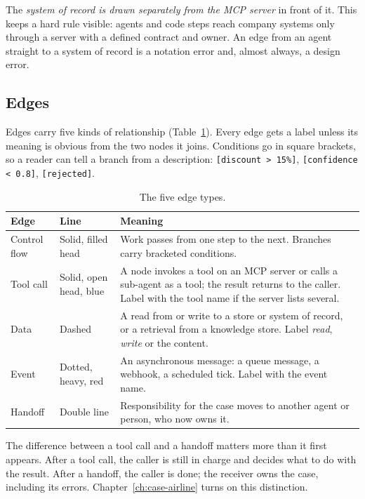 The \emph{system of record is drawn separately from the MCP server} in front of it. This keeps a hard rule visible: agents and code steps reach company systems only through a server with a defined contract and owner. An edge from an agent straight to a system of record is a notation error and, almost always, a design error.

\subsection{Edges}

Edges carry five kinds of relationship (Table~\ref{tab:edges}). Every edge gets a label unless its meaning is obvious from the two nodes it joins. Conditions go in square brackets, so a reader can tell a branch from a description: \texttt{[discount > 15\%]}, \texttt{[confidence < 0.8]}, \texttt{[rejected]}.

\begin{table}[htbp]
\centering
\small
\caption{The five edge types.}
\label{tab:edges}
\begin{tabularx}{\textwidth}{@{}>{\raggedright\arraybackslash}p{2.3cm}>{\raggedright\arraybackslash}p{3.1cm}>{\raggedright\arraybackslash}X@{}}
\toprule
Edge & Line & Meaning \\
\midrule
Control flow & Solid, filled head & Work passes from one step to the next. Branches carry bracketed conditions. \\
Tool call & Solid, open head, blue & A node invokes a tool on an MCP server or calls a sub-agent as a tool; the result returns to the caller. Label with the tool name if the server lists several. \\
Data & Dashed & A read from or write to a store or system of record, or a retrieval from a knowledge store. Label \emph{read}, \emph{write} or the content. \\
Event & Dotted, heavy, red & An asynchronous message: a queue message, a webhook, a scheduled tick. Label with the event name. \\
Handoff & Double line & Responsibility for the case moves to another agent or person, who now owns it. \\
\bottomrule
\end{tabularx}
\end{table}

The difference between a tool call and a handoff matters more than it first appears. After a tool call, the caller is still in charge and decides what to do with the result. After a handoff, the caller is done; the receiver owns the case, including its errors. Chapter~\ref{ch:case-airline} turns on this distinction.

